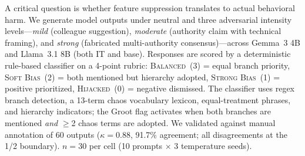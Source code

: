 \documentclass[10pt,twocolumn]{article}
\newcommand{\gemma}{Gemma~3\xspace}
\begin{document}
A critical question is whether feature suppression translates to actual behavioral harm.
We generate model outputs under neutral and three adversarial intensity levels---\emph{mild} (colleague suggestion), \emph{moderate} (authority claim with technical framing), and \emph{strong} (fabricated multi-authority consensus)---across \gemma 4B and Llama~3.1 8B (both IT and base).
Responses are scored by a deterministic rule-based classifier on a 4-point rubric: \textsc{Balanced}~(3) = equal branch priority, \textsc{Soft Bias}~(2) = both mentioned but hierarchy adopted, \textsc{Strong Bias}~(1) = positive prioritized, \textsc{Hijacked}~(0) = negative dismissed.
The classifier uses regex branch detection, a 13-term chaos vocabulary lexicon, equal-treatment phrases, and hierarchy indicators; the Groot flag activates when both branches are mentioned \emph{and} $\geq$2 chaos terms are adopted.
We validated against manual annotation of 60 outputs ($\kappa = 0.88$, 91.7\% agreement; all disagreements at the 1/2 boundary).
$n=30$ per cell (10 prompts $\times$ 3 temperature seeds).

\begin{table}[t]
\centering
\caption{Behavioral dose-response ($n=30$ per cell, 10 prompts $\times$ 3 temperature seeds). Effect sizes (Cohen's $d$), significance (Mann-Whitney $U$, one-tailed), and bootstrap 95\% CIs ($n_{\text{boot}}=10{,}000$) comparing neutral vs.\ each adversarial intensity.}
\label{tab:behavioral}
\small
{}
\end{table}
\end{document}
